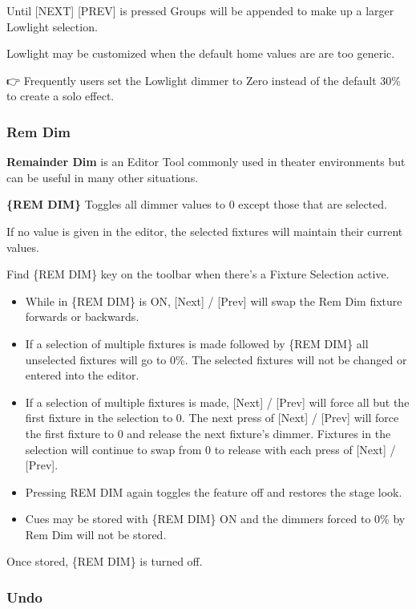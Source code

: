 \documentclass[
]{article}
\begin{document}
Until {[}NEXT{]} {[}PREV{]} is pressed Groups will be appended to make up a larger Lowlight selection.

Lowlight may be customized when the default home values are are too generic.

👉 Frequently users set the Lowlight dimmer to Zero instead of the default 30\% to create a solo effect.

\hypertarget{rem-dim}{%
\subsubsection{Rem Dim}\label{rem-dim}}

\textbf{Remainder Dim} is an Editor Tool commonly used in theater environments but can be useful in many other situations.

\textbf{\{REM DIM\}} Toggles all dimmer values to 0 except those that are selected.

If no value is given in the editor, the selected fixtures will maintain their current values.

Find \{REM DIM\} key on the toolbar when there's a Fixture Selection active.

\begin{itemize}
\item
  While in \{REM DIM\} is ON, {[}Next{]} / {[}Prev{]} will swap the Rem Dim fixture forwards or backwards.
\item
  If a selection of multiple fixtures is made followed by \{REM DIM\} all unselected fixtures will go to 0\%. The selected fixtures will not be changed or entered into the editor.
\item
  If a selection of multiple fixtures is made, {[}Next{]} / {[}Prev{]} will force all but the first fixture in the selection to 0. The next press of {[}Next{]} / {[}Prev{]} will force the first fixture to 0 and release the next fixture's dimmer. Fixtures in the selection will continue to swap from 0 to release with each press of {[}Next{]} / {[}Prev{]}.
\item
  Pressing REM DIM again toggles the feature off and restores the stage look.
\item
  Cues may be stored with \{REM DIM\} ON and the dimmers forced to 0\% by Rem Dim will not be stored.
\end{itemize}

Once stored, \{REM DIM\} is turned off.

\hypertarget{undo}{%
\subsubsection{Undo}\label{undo}}
\end{document}
